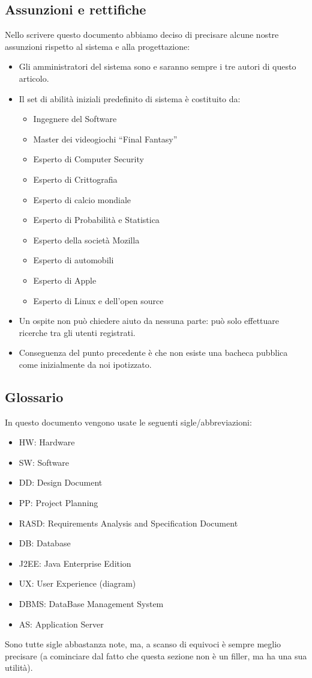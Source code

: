 \subsection{Assunzioni e rettifiche}
Nello scrivere questo documento abbiamo deciso di precisare alcune nostre assunzioni rispetto al sistema e alla progettazione:
\begin{itemize}
 \item Gli amministratori del sistema sono e saranno sempre i tre autori di questo articolo.
 \item Il set di abilità iniziali predefinito di sistema è costituito da:
 \begin{itemize}
  \item Ingegnere del Software
  \item Master dei videogiochi ``Final Fantasy''
  \item Esperto di Computer Security
  \item Esperto di Crittografia
  \item Esperto di calcio mondiale
  \item Esperto di Probabilità e Statistica
  \item Esperto della società Mozilla
  \item Esperto di automobili
  \item Esperto di Apple
  \item Esperto di Linux e dell'open source
 \end{itemize}
 \item Un ospite non può chiedere aiuto da nessuna parte: può solo effettuare ricerche tra gli utenti registrati.
 \item Conseguenza del punto precedente è che non esiste una bacheca pubblica come inizialmente da noi ipotizzato.
\end{itemize}


\subsection{Glossario}
In questo documento vengono usate le seguenti sigle/abbreviazioni:
\begin{itemize}
 \item HW: Hardware
 \item SW: Software
 \item DD: Design Document
 \item PP: Project Planning
 \item RASD: Requirements Analysis and Specification Document
 \item DB: Database
 \item J2EE: Java Enterprise Edition
 \item UX: User Experience (diagram)
 \item DBMS: DataBase Management System
 \item AS: Application Server
\end{itemize}
Sono tutte sigle abbastanza note, ma, a scanso di equivoci è sempre meglio precisare (a cominciare dal fatto che questa sezione non è un filler, ma ha una sua utilità).

